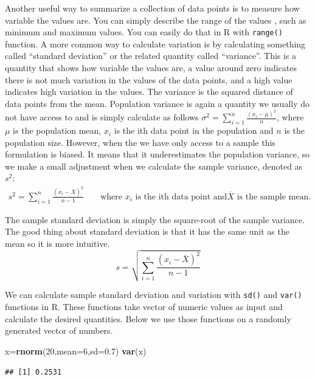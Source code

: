 \documentclass[12pt,]{krantz}
\newenvironment{Shaded}{\begin{snugshade}}{\end{snugshade}}
\newcommand{\DataTypeTok}[1]{\textcolor[rgb]{0.13,0.29,0.53}{#1}}
\newcommand{\DecValTok}[1]{\textcolor[rgb]{0.00,0.00,0.81}{#1}}
\newcommand{\FloatTok}[1]{\textcolor[rgb]{0.00,0.00,0.81}{#1}}
\newcommand{\KeywordTok}[1]{\textcolor[rgb]{0.13,0.29,0.53}{\textbf{#1}}}
\newcommand{\NormalTok}[1]{#1}
\theoremstyle{definition}
\theoremstyle{definition}
\theoremstyle{definition}
\theoremstyle{remark}
\begin{document}
Another useful way to summarize a collection of data points is to
measure how variable the values are. You can simply describe the range
of the values , such as minimum and maximum values. You can easily do
that in R with \texttt{range()} function. A more common way to calculate
variation is by calculating something called ``standard deviation'' or
the related quantity called ``variance''. This is a quantity that shows
how variable the values are, a value around zero indicates there is not
much variation in the values of the data points, and a high value
indicates high variation in the values. The variance is the squared
distance of data points from the mean. Population variance is again a
quantity we usually do not have access to and is simply calculate as
follows \(\sigma^2=\sum_{i=1}^n \frac{(x_i-\mu)^2}{n}\), where \(\mu\)
is the population mean, \(x_i\) is the ith data point in the population
and \(n\) is the population size. However, when the we have only access
to a sample this formulation is biased. It means that it underestimates
the population variance, so we make a small adjustment when we calculate
the sample variance, denoted as \(s^2\): \[
\begin{aligned}
s^2=\sum_{i=1}^n \frac{(x_i-\overline{X})^2}{n-1} && \text{ where $x_i$ is the ith data point and
$\overline{X}$ is the sample mean.}
\end{aligned}
\]

The sample standard deviation is simply the square-root of the sample
variance. The good thing about standard deviation is that it has the
same unit as the mean so it is more intuitive.\\
\[s=\sqrt{\sum_{i=1}^n \frac{(x_i-\overline{X})^2}{n-1}}\]

We can calculate sample standard deviation and variation with
\texttt{sd()} and \texttt{var()} functions in R. These functions take
vector of numeric values as input and calculate the desired quantities.
Below we use those functions on a randomly generated vector of numbers.

\begin{Shaded}
\begin{Highlighting}[]
\NormalTok{x=}\KeywordTok{rnorm}\NormalTok{(}\DecValTok{20}\NormalTok{,}\DataTypeTok{mean=}\DecValTok{6}\NormalTok{,}\DataTypeTok{sd=}\FloatTok{0.7}\NormalTok{)}
\KeywordTok{var}\NormalTok{(x)}
\end{Highlighting}
\end{Shaded}

\begin{verbatim}
## [1] 0.2531
\end{verbatim}
\end{document}
